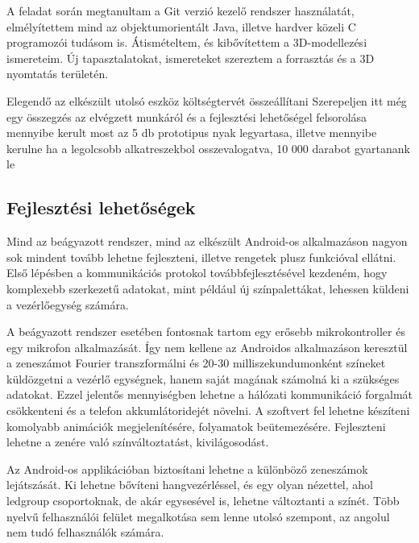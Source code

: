 \documentclass[../main.tex]{subfiles}
\begin{document}
        A feladat során megtanultam a Git verzió kezelő rendszer használatát, elmélyítettem mind az objektumorientált Java, illetve hardver közeli C programozói tudásom is. Átismételtem, és kibővítettem a 3D-modellezési ismereteim. Új tapasztalatokat, ismereteket szereztem a forrasztás és a 3D nyomtatás területén. 
    
    

Elegendő az elkészült utolsó eszköz költségtervét összeállítani
Szerepeljen itt még egy összegzés az elvégzett munkáról és a fejlesztési lehetőségel felsorolása
    mennyibe kerult most az 5 db prototipus nyak legyartasa, illetve mennyibe kerulne ha a legolcsobb alkatreszekbol osszevalogatva, 10 000 darabot gyartanank le
    
    
    \subsection{Fejlesztési lehetőségek}
        Mind az beágyazott rendszer, mind az elkészült Android-os alkalmazáson nagyon sok mindent tovább lehetne fejleszteni, illetve rengetek plusz funkcióval ellátni. Első lépésben a kommunikációs protokol továbbfejlesztésével kezdeném, hogy komplexebb szerkezetű adatokat, mint például új színpalettákat, lehessen küldeni a vezérlőegység számára.
        
        A beágyazott rendszer esetében fontosnak tartom egy erősebb mikrokontroller és egy mikrofon alkalmazását. Így nem kellene az Androidos alkalmazáson keresztül a zeneszámot Fourier transzformálni és 20-30 milliszekundumonként színeket küldözgetni a vezérlő egységnek, hanem saját magának számolná ki a szükséges adatokat. Ezzel jelentős mennyiségben lehetne a hálózati kommunikáció forgalmát csökkenteni és a telefon akkumlátoridejét növelni. A szoftvert fel lehetne készíteni komolyabb animációk megjelenítésére, folyamatok beütemezésére. Fejleszteni lehetne a zenére való színváltoztatást, kivilágosodást.
        
        Az Android-os applikációban biztosítani lehetne a különböző zeneszámok lejátszását. Ki lehetne bővíteni hangvezérléssel, és egy olyan nézettel, ahol ledgroup csoportoknak, de akár egysesével is, lehetne változtanti a színét. Több nyelvű felhasználói felület megalkotása sem lenne utolsó szempont, az angolul nem tudó felhasználók számára. 
        
        
\end{document}
